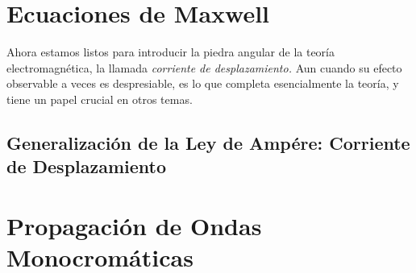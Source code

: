 \chapter{Ecuaciones de Maxwell}
Ahora estamos listos para introducir la piedra angular de la teoría electromagnética, la llamada \textit{corriente de desplazamiento.} Aun cuando su efecto observable a veces es despresiable, es lo que completa esencialmente la teoría, y tiene un papel crucial en otros temas.

\section{Generalización de la Ley de Ampére: Corriente de Desplazamiento}














\chapter{Propagación de Ondas Monocromáticas}










































